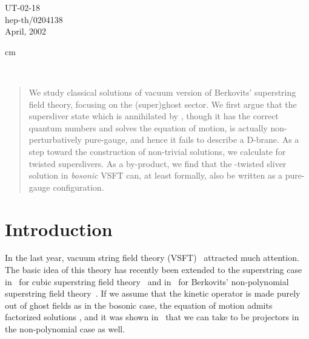 \documentclass[a4paper,12pt]{article}
\providecommand{\cQ}{\mathcal{Q}}
\providecommand{\sectiono}[1]{\section{#1}\setcounter{equation}{0}}
\begin{document}
\begin{titlepage}
\thispagestyle{empty}
\begin{flushright}
UT-02-18 \\
hep-th/0204138 \\
April, 2002 
\end{flushright}

 cm

\begin{center}
\vskip 1.5cm
\\ 
\vspace{1cm}
\end{center}
\vspace{1cm}
\begin{abstract}
We study classical solutions of vacuum version of Berkovits' superstring field theory, focusing on 
the (super)ghost sector. We first argue that the supersliver state which is annihilated 
by \coordHE{}, though it has the correct quantum numbers and solves the equation of motion, 
is actually non-perturbatively pure-gauge, and hence it fails to describe a D-brane. 
As a step toward the construction of non-trivial solutions, we calculate 
\myHighlight{$e^{-\widehat{\Phi}}\widehat{\cQ}e^{\widehat{\Phi}}$}\coordHE{} for twisted superslivers. 
As a by-product, we find that the \coordHE{}-twisted sliver solution 
in \textit{bosonic} VSFT can, at least formally, also be written as a pure-gauge configuration. 
\end{abstract}
\end{titlepage}
\newpage
\baselineskip 6mm


\sectiono{Introduction}
In the last year, vacuum string field theory (VSFT)~\cite{RSZ1,VSFT,GRSZ1} attracted much attention. 
The basic idea of this theory has recently been extended to the superstring case 
in~\cite{NSms,ABG,NSgs} for cubic superstring field theory~\cite{CSSFT,ABGKM} and in~\cite{MS} 
for Berkovits' non-polynomial superstring field theory~\cite{SSFT,Brev}. If we assume that the kinetic 
operator \myHighlight{$\cQ$}\coordHE{} is made purely out of ghost fields as in the bosonic case, the equation of motion admits 
factorized solutions \coordHE{}, and it was shown in~\cite{MS} 
that we can take \coordHE{} to be projectors in the non-polynomial case as well. 
\end{document}
